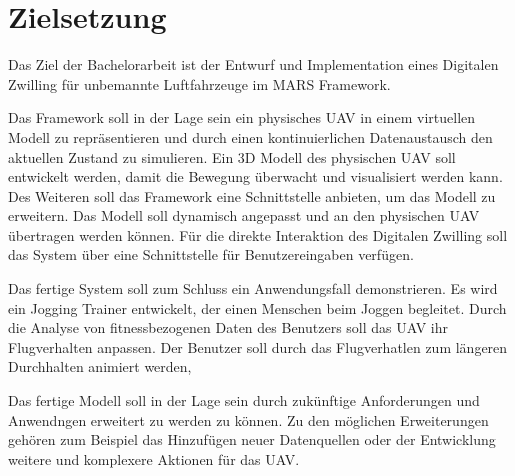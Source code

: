 \section{Zielsetzung}


Das Ziel der Bachelorarbeit ist der Entwurf und Implementation eines Digitalen Zwilling für unbemannte Luftfahrzeuge im MARS Framework.

Das Framework soll in der Lage sein ein physisches UAV in einem virtuellen Modell zu repräsentieren und durch einen kontinuierlichen Datenaustausch den aktuellen Zustand zu simulieren. Ein 3D Modell des physischen UAV soll entwickelt werden, damit die Bewegung überwacht und visualisiert werden kann. Des Weiteren soll das Framework eine Schnittstelle anbieten, um das Modell zu erweitern. Das Modell soll dynamisch angepasst und an den physischen UAV übertragen werden können. Für die direkte Interaktion des Digitalen Zwilling soll das System über eine Schnittstelle für Benutzereingaben verfügen.

Das fertige System soll zum Schluss ein Anwendungsfall demonstrieren. Es wird ein Jogging Trainer entwickelt, der einen Menschen beim Joggen begleitet. Durch die Analyse von fitnessbezogenen Daten des Benutzers soll das UAV ihr Flugverhalten anpassen. Der Benutzer soll durch das Flugverhatlen zum längeren Durchhalten animiert werden, 

Das fertige Modell soll in der Lage sein durch zukünftige Anforderungen und Anwendngen erweitert zu werden zu können. Zu den möglichen Erweiterungen gehören zum Beispiel das Hinzufügen neuer Datenquellen oder der Entwicklung weitere und komplexere Aktionen für das UAV.
